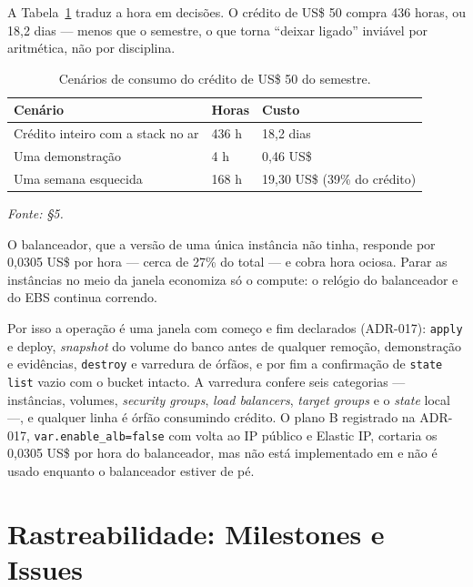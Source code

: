 \documentclass[11pt,a4paper]{article}
\begin{document}
A Tabela~\ref{tab:cenarios} traduz a hora em decisões. O crédito de US\$ 50 compra 436 horas, ou
18,2 dias --- menos que o semestre, o que torna ``deixar ligado'' inviável por aritmética, não por
disciplina.

\begin{table}[tb]
\caption{Cenários de consumo do crédito de US\$ 50 do semestre.}
\label{tab:cenarios}
\centering\small
\begin{tabularx}{\textwidth}{p{6.0cm}p{3.2cm}X}
\toprule
\textbf{Cenário} & \textbf{Horas} & \textbf{Custo} \\
\midrule
Crédito inteiro com a stack no ar & 436 h & 18,2 dias \\
Uma demonstração & 4 h & 0,46 US\$ \\
Uma semana esquecida & 168 h & 19,30 US\$ (39\% do crédito) \\
\bottomrule
\end{tabularx}
{\small\itshape Fonte:  §5.}
\end{table}

O balanceador, que a versão de uma única instância não tinha, responde por 0,0305 US\$ por hora ---
cerca de 27\% do total --- e cobra hora ociosa. Parar as instâncias no meio da janela economiza só o
compute: o relógio do balanceador e do EBS continua correndo.

Por isso a operação é uma janela com começo e fim declarados (ADR-017): \texttt{apply} e deploy,
\emph{snapshot} do volume do banco antes de qualquer remoção, demonstração e evidências,
\texttt{destroy} e varredura de órfãos, e por fim a confirmação de \texttt{state list} vazio com o
bucket intacto. A varredura confere seis categorias --- instâncias, volumes, \emph{security groups},
\emph{load balancers}, \emph{target groups} e o \emph{state} local ---, e qualquer linha é órfão
consumindo crédito. O plano B registrado na ADR-017, \texttt{var.enable\_\allowbreak{}alb=false} com volta ao IP
público e Elastic IP, cortaria os 0,0305 US\$ por hora do balanceador, mas não está implementado em
 e não é usado enquanto o balanceador estiver de pé.

\section{Rastreabilidade: Milestones e Issues}
\end{document}
